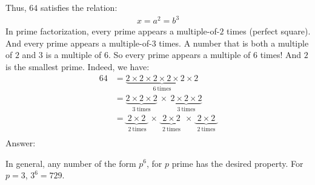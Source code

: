 \documentclass[12pt]{article}
\begin{document}
\begin{answer}
Thus, $64$ satisfies the relation:
\begin{align*}
x = a^2 = b^3
\end{align*}
In prime factorization, every prime appears a multiple-of-$2$ times (perfect square). And every prime appears a multiple-of-$3$ times. A number that is both a multiple of $2$ and $3$ is a multiple of $6$. So every prime appears a multiple of $6$ times! And $2$ is the smallest prime. Indeed, we have:
\begin{align*}
64 & = \underbrace{2 \times 2 \times 2 \times 2 \times 2 \times 2}_{6~\text{times}} \\
   & = \underbrace{2 \times 2 \times 2}_{3~\text{times}} ~\times~ \underbrace{2 \times 2 \times 2}_{3~\text{times}} \\
   & = \underbrace{~2 \times 2~}_{~2~\text{times}} ~\times~ \underbrace{~2 \times 2~}_{2~\text{times}} ~\times~ \underbrace{~2 \times 2~}_{2~\text{times}} \\
\end{align*}
Answer: 

In general, any number of the form $p^{6}$, for $p$ prime has the desired property. For $p=3$, $3^{6}=729$. 
\end{answer}
\end{document}
